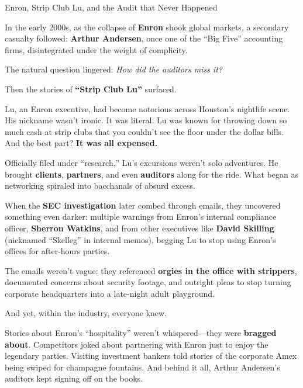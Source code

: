 \begin{HistoricalSidebar}{Enron, Strip Club Lu, and the Audit that Never Happened}

  In the early 2000s, as the collapse of \textbf{Enron} shook global markets, a secondary casualty followed: 
  \textbf{Arthur Andersen}, once one of the “Big Five” accounting firms, disintegrated under the weight of 
  complicity.  

  \medskip
  
  The natural question lingered: \textit{How did the auditors miss it?}  

  \medskip
  
  Then the stories of \textbf{“Strip Club Lu”} surfaced.  
  
  \medskip
  
  Lu, an Enron executive, had become notorious across Houston’s nightlife scene. His nickname wasn’t ironic. 
  It was literal. Lu was known for throwing down so much cash at strip clubs that you couldn’t see the floor 
  under the dollar bills. And the best part?  \textbf{It was all expensed.}  

  \medskip
  
  Officially filed under “research,” Lu’s excursions weren’t solo adventures. He brought \textbf{clients}, 
  \textbf{partners}, and even \textbf{auditors} along for the ride. What began as networking spiraled into 
  bacchanals of absurd excess.  
  
  \medskip
  
  When the \textbf{SEC investigation} later combed through emails, they uncovered something even darker: 
  multiple warnings from Enron’s internal compliance officer, \textbf{Sherron Watkins}, and from other 
  executives like \textbf{David Skilling} (nicknamed “Skelleg” in internal memos), begging Lu to stop 
  using Enron’s offices for after-hours parties.  

  \medskip
  
  The emails weren’t vague: they referenced \textbf{orgies in the office with strippers}, documented 
  concerns about security footage, and outright pleas to stop turning corporate headquarters into a 
  late-night adult playground.  
  
  \medskip
  
  And yet, within the industry, everyone knew.  

  \medskip
  
  Stories about Enron’s “hospitality” weren’t whispered—they were \textbf{bragged about}. Competitors joked 
  about partnering with Enron just to enjoy the legendary parties. Visiting investment bankers told stories 
  of the corporate Amex being swiped for champagne fountains. And behind it all, Arthur Andersen’s auditors 
  kept signing off on the books.  
  

\end{HistoricalSidebar}
